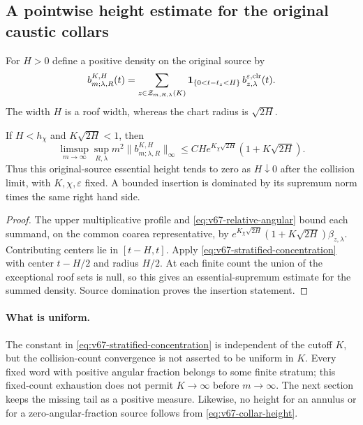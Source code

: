 \subsection{A pointwise height estimate for the original caustic collars}
For $H>0$ define a positive density on the original source by
\begin{equation}\label{eq:v67-stratified-collar-density}
 b^{K,H}_{m;\lambda,R}(t)
 =\sum_{z\in\mathcal Z_{m,R,\lambda}(K)}
    \one_{\{0<t-t_z<H\}}\,
                 b_{z,\lambda}^{\varepsilon,\mathrm{clr}}(t).
\end{equation}
The width $H$ is a roof width, whereas the chart radius is $\sqrt{2H}$.

\begin{corollary}
\label{cor:v67-collar-height}
If $H<h_\chi$ and $K\sqrt{2H}<1$, then
\begin{equation}\label{eq:v67-collar-height}
 \limsup_{m\to\infty}\sup_{R,\lambda}
    m^2\|b^{K,H}_{m;\lambda,R}\|_\infty
 \le C H e^{K_\chi\sqrt{2H}}(1+K\sqrt{2H}).
\end{equation}
Thus this original-source essential height tends to zero as
$H\downarrow0$ after the collision limit, with $K,\chi,\varepsilon$
fixed. A bounded insertion is dominated by its supremum norm times
the same right hand side.
\end{corollary}
\begin{proof}
The upper multiplicative profile and
\eqref{eq:v67-relative-angular} bound each summand, on the common
coarea representative, by
$e^{K_\chi\sqrt{2H}}(1+K\sqrt{2H})\beta_{z,\lambda}$.
Contributing centers lie in $[t-H,t]$. Apply
\eqref{eq:v67-stratified-concentration} with center $t-H/2$ and
radius $H/2$. At each finite count the union of the exceptional roof
sets is null, so this gives an essential-supremum estimate for the
summed density. Source domination proves the insertion statement.
\end{proof}

\paragraph{What is uniform.}
The constant in \eqref{eq:v67-stratified-concentration} is independent
of the cutoff $K$, but the collision-count convergence is not asserted
to be uniform in $K$. Every fixed word with positive angular fraction
belongs to some finite stratum; this fixed-count exhaustion does not
permit $K\to\infty$ before $m\to\infty$. The next section keeps the
missing tail as a positive measure. Likewise, no height for an annulus
or for a zero-angular-fraction source follows from
\eqref{eq:v67-collar-height}.
